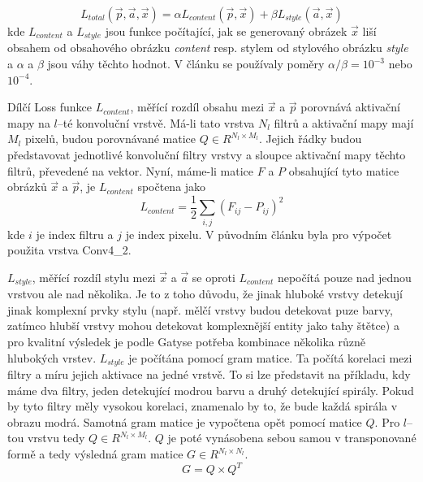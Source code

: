 \documentclass[twocolumn]{article}
\begin{document}
	\begin{equation*}
		L_{total}(\overrightarrow{p}, \overrightarrow{a}, \overrightarrow{x}) = \alpha L_{content}(\overrightarrow{p}, \overrightarrow{x}) + \beta L_{style} (\overrightarrow{a}, \overrightarrow{x})
	\end{equation*}
	kde $L_{content}$ a $L_{style}$ jsou funkce počítající, jak se generovaný obrázek $\overrightarrow{x}$ liší obsahem od obsahového obrázku \textit{content} resp. stylem od stylového obrázku \textit{style} a $\alpha$ a $\beta$ jsou váhy těchto hodnot. V článku se používaly poměry $\alpha / \beta = 10^{-3}$ nebo $10^{-4}$.
	\par
	Dílčí Loss funkce $L_{content}$, měřící rozdíl obsahu mezi  $\overrightarrow{x}$ a  $\overrightarrow{p}$ porovnává aktivační mapy na $l$--té konvoluční vrstvě. Má-li tato vrstva $N_l$ filtrů a aktivační mapy mají $M_l$ pixelů, budou porovnávané matice $Q \in R^{N_l \times M_l}$. Jejich řádky budou představovat jednotlivé konvoluční filtry vrstvy a sloupce aktivační mapy těchto filtrů, převedené na vektor. Nyní, máme-li matice $F$ a $P$ obsahující tyto matice obrázků $\overrightarrow{x}$ a  $\overrightarrow{p}$, je $L_{content}$ spočtena jako
		\begin{equation*}
		L_{content} = \dfrac{1}{2} \sum_{i,j} (F_{ij} - P_{ij})^2
	\end{equation*}
	kde $i$ je index filtru a $j$ je index pixelu. V původním článku byla pro výpočet použita vrstva Conv4\_2.
	\par
	$L_{style}$, měřící rozdíl stylu mezi  $\overrightarrow{x}$ a  $\overrightarrow{a}$ se oproti $L_{content}$ nepočítá pouze nad jednou vrstvou ale nad několika. Je to z toho důvodu, že jinak hluboké vrstvy detekují jinak komplexní prvky stylu (např. mělčí vrstvy budou detekovat puze barvy, zatímco hlubší vrstvy mohou detekovat komplexnější entity jako tahy štětce) a pro kvalitní výsledek je podle Gatyse potřeba kombinace několika různě hlubokých vrstev. $L_{style}$ je počítána pomocí gram matice. Ta počítá korelaci mezi filtry a míru jejich aktivace na jedné vrstvě. To si lze představit na příkladu, kdy máme dva filtry, jeden detekující modrou barvu a druhý detekující spirály. Pokud by tyto filtry měly vysokou korelaci, znamenalo by to, že bude každá spirála v obrazu modrá. Samotná gram matice je vypočtena opět pomocí matice $Q$. Pro $l$--tou vrstvu tedy $Q \in R^{N_l \times M_l}$. $Q$ je poté vynásobena sebou samou v transponované formě a tedy výsledná gram matice $G \in R^{ N_l \times N_l}$.
	\begin{equation*}
		G = Q \times Q^T
	\end{equation*}
\end{document}
